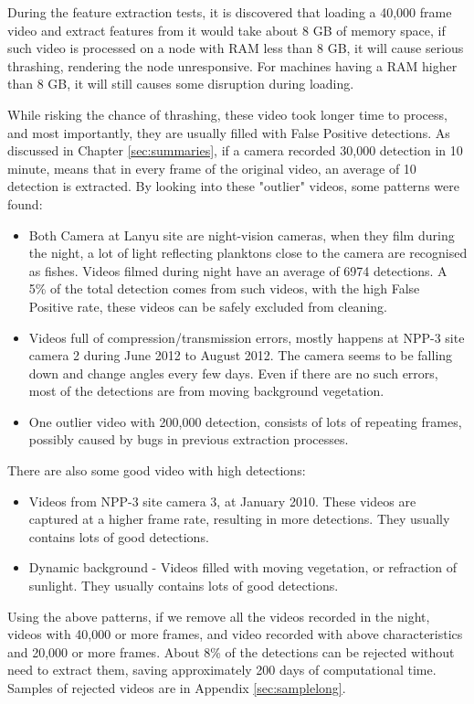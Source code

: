 \documentclass[bsc,logo,twoside,fullspacing,parskip]{infthesis}
\begin{document}
During the feature extraction tests, it is discovered that loading a 40,000 frame video and extract features from it would take about 8 GB of memory space, if such video is processed on a node with RAM less than 8 GB, it will cause serious thrashing, rendering the node unresponsive. For machines having a RAM higher than 8 GB, it will still causes some disruption during loading.  

While risking the chance of thrashing, these video took longer time to process, and most importantly, they are usually filled with False Positive detections. As discussed in Chapter \ref{sec:summaries}, if a camera recorded 30,000 detection in 10 minute, means that in every frame of the original video, an average of 10 detection is extracted. By looking into these "outlier" videos, some patterns were found:

\begin{itemize}
\item
Both Camera at Lanyu site are night-vision cameras, when they film during the night, a lot of light reflecting planktons close to the camera are recognised as fishes. Videos filmed during night have an average of 6974 detections. A 5\% of the total detection comes from such videos, with the high False Positive rate, these videos can be safely excluded from cleaning.
\item
Videos full of compression/transmission errors, mostly happens at NPP-3 site camera 2 during June 2012 to August 2012. The camera seems to be falling down and change angles every few days. Even if there are no such errors, most of the detections are from moving background vegetation.
\item
One outlier video with 200,000 detection, consists of lots of repeating frames, possibly caused by bugs in previous extraction processes.
\end{itemize}
There are also some good video with high detections: 
\begin{itemize}
\item
Videos from NPP-3 site camera 3, at January 2010. These videos are captured at a higher frame rate, resulting in more detections. They usually contains lots of good detections.
\item
Dynamic background - Videos filled with moving vegetation, or refraction of sunlight. They usually contains lots of good detections.
\end{itemize}

Using the above patterns, if we remove all the videos recorded in the night, videos with 40,000 or more frames, and video recorded with above characteristics and 20,000 or more frames. About 8\% of the detections can be rejected without need to extract them, saving approximately 200 days of computational time.
Samples of rejected videos are in Appendix \ref{sec:samplelong}.
\end{document}
